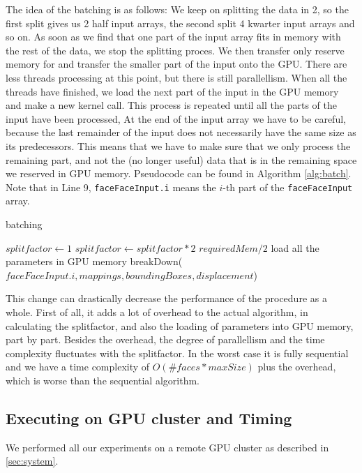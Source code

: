 The idea of the batching is as follows: We keep on splitting the data in 2, so the first split gives us 2 half input arrays, the second split 4 kwarter input arrays and so on. As soon as we find that one part of the input array fits in memory with the rest of the data, we stop the splitting proces. We then transfer only reserve memory for and transfer the smaller part of the input onto the GPU. There are less threads processing at this point, but there is still parallellism. When all the threads have finished, we load the next part of the input in the GPU memory and make a new kernel call. This process is repeated until all the parts of the input have been processed, At the end of the input array we have to be careful, because the last remainder of the input does not necessarily have the same size as its predecessors. This means that we have to make sure that we only process the remaining part, and not the (no longer useful) data that is in the remaining space we reserved in GPU memory. Pseudocode can be found in Algorithm \ref{alg:batch}. Note that in Line 9, \texttt{faceFaceInput.i} means the $i$-th part of the \texttt{faceFaceInput} array.

\begin{algorithm}
\caption{batching}\label{alg:batch}
\begin{algorithmic}[1]
    \State $splitfactor \gets 1$
        \State $splitfactor \gets splitfactor * 2$
        \State $requiredMem / 2$
    \EndWhile
        \State load all the parameters in GPU memory
        \State breakDown($faceFaceInput.i, mappings, boundingBoxes, displacement $) 
    \EndFor
\EndProcedure
\end{algorithmic}
\end{algorithm}

This change can drastically decrease the performance of the procedure as a whole. First of all, it adds a lot of overhead to the actual algorithm, in calculating the splitfactor, and also the loading of parameters into GPU memory, part by part. Besides the overhead, the degree of parallellism and the time complexity fluctuates with the splitfactor. In the worst case it is fully sequential and we have a time complexity of $O(\#faces *  maxSize)$ plus the overhead, which is worse than the sequential algorithm.

\subsection{Executing on GPU cluster and Timing}
We performed all our experiments on a remote GPU cluster as described in \ref{sec:system}.

